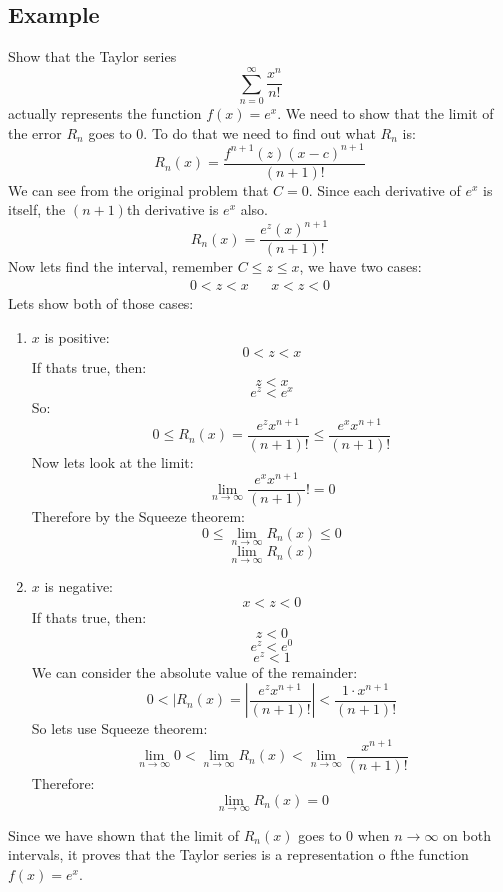 \documentclass{report}
\begin{document}
    \subsection{Example}
        Show that the Taylor series
        \[\sum_{n=0}^{\infty} \frac{x^n}{n!}\]
        actually represents the function \(f(x) = e^x\).
        We need to show that the limit of the error \(R_n\) goes to \(0\).
        To do that we need to find out what \(R_n\) is:
        \[R_n(x) = \frac{f^{n+1}(z)(x-c)^{n+1}}{(n+1)!}\]
        We can see from the original problem that \(C = 0\).
        Since each derivative of \(e^x\) is itself, the \((n+1)\)th derivative is \(e^x\) also.
        \[R_n(x) = \frac{e^z (x)^{n+1}}{(n+1)!}\]
        Now lets find the interval, remember \(C \leq z \leq x\), we have two cases:
        \begin{align*}
            0 < z < x && x < z < 0
        \end{align*}
        Lets show both of those cases:
        \begin{enumerate}
            \item \(x\) is positive:
            \[0 < z < x\]
            If thats true, then:
            \[z < x\]
            \[e^z < e^x\]
            So:
            \[0 \leq R_n(x) = \frac{e^z x^{n+1}}{(n+1)!} \leq \frac{e^x x^{n+1}}{(n+1)!}\]
            Now lets look at the limit:
            \[\lim_{n \to \infty} \frac{e^x x^{n+1}}{(n+1)}! = 0\]
            Therefore by the Squeeze theorem:
            \[0 \leq \lim_{n \to \infty} R_n(x) \leq 0\]
            \[\lim_{n \to \infty} R_n(x)\]
            \item \(x\) is negative:
            \[x < z < 0\]
            If thats true, then:
            \[z < 0\]
            \[e^z < e^0\]
            \[e^z < 1\]
            We can consider the absolute value of the remainder:
            \[0 < |R_n(x) = \left| \frac{e^z x^{n+1}}{(n+1)!} \right| < \frac{1 \cdot x^{n+1}}{(n+1)!}\]
            So lets use Squeeze theorem:
            \[\lim_{n \to \infty} 0 < \lim_{n \to \infty} R_n(x) < \lim_{n \to \infty} \frac{x^{n+1}}{(n+1)!}\]
            Therefore:
            \[\lim_{n \to \infty} R_n(x) = 0\]
        \end{enumerate}
        Since we have shown that the limit of \(R_n(x)\) goes to \(0\) when \(n \to \infty\) on both intervals, it proves that the Taylor series
        is a representation o fthe function \(f(x) = e^x\).
    
\end{document}
